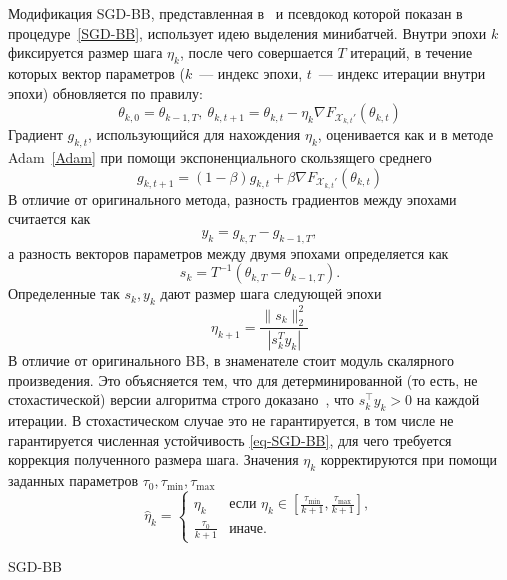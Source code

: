 \documentclass[preprint,12pt]{elsarticle}
\begin{document}
{Модификация SGD-BB, представленная в~\cite{BB-DL} и псевдокод которой показан в процедуре~\ref{SGD-BB}, использует идею выделения минибатчей. Внутри эпохи $k$ фиксируется размер шага $\eta_k$, после чего совершается $T$ итераций, в течение которых вектор параметров ($k$~--- индекс эпохи, $t$~--- индекс итерации внутри эпохи) обновляется по правилу:
$$\theta_{k, 0} = \theta_{k-1, T},~\theta_{k, t+1} = \theta_{k, t} - {\eta}_k \nabla F_{\mathcal{X}_{k, t}'}(\theta_{k, t})$$
Градиент $g_{k, t}$, использующийся для нахождения ${\eta_k}$, оценивается как и в методе Adam~\ref{Adam} при помощи экспоненциального скользящего среднего
$$g_{k, t+1} = (1 - \beta) g_{k, t} + \beta \nabla F_{\mathcal{X}_{k, t}'}(\theta_{k, t})$$
В отличие от оригинального метода, разность градиентов между эпохами считается как
$$y_k = g_{k, T} - g_{k-1, T},$$
а разность векторов параметров между двумя эпохами определяется как
$$s_k = T^{-1}(\theta_{k, T} - \theta_{k-1, T}).$$
Определенные так $s_k, y_k$ дают размер шага следующей эпохи
\begin{equation}\label{eq-SGD-BB}
    \eta_{k+1} = \frac{\|s_k\|_2^2}{|s_k^Ty_k|}
\end{equation}
В отличие от оригинального BB, в знаменателе стоит модуль скалярного произведения. Это объясняется тем, что для детерминированной (то есть, не стохастической) версии алгоритма строго доказано~\cite{BBconvergence}, что $s_k^\top y_k > 0$ на каждой итерации. В стохастическом случае это не гарантируется, в том числе не гарантируется численная устойчивость \eqref{eq-SGD-BB}, для чего требуется коррекция полученного размера шага.
Значения $\eta_k$ корректируются при помощи заданных параметров $\tau_0, \tau_{\text{min}}, \tau_{\text{max}}$
$$\hat{\eta}_k = \begin{cases}
        \eta_k & \text{если } \eta_k \in \left[\frac{\tau_{\text{min}}}{k+1}, \frac {\tau_{\text{max}}}{k+1}\right], \\
        \frac{\tau_0}{k+1} & \text{иначе.}
    \end{cases}$$
\begin{algorithm}[H]\label{SGD-BB}
\caption {SGD-BB}
\SetAlgoLined
\Input{Число эпох $K$ \newline
        Число шагов в эпохе $T$ \newline
        Размер шага $\eta_0 = \eta_1$ \newline
        Экспоненциальная скорость затухания $\beta \in (0, 1]$ \newline
        Начальное приближение $\theta_{0, 0}$ \newline
}
\end{algorithm}}
\end{document}
